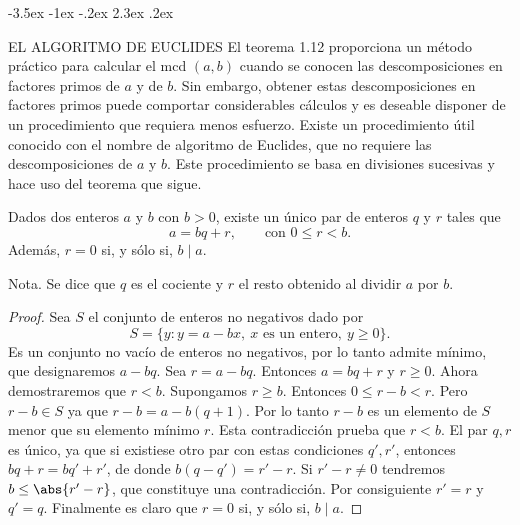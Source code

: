 \documentclass[12pt,a4paper]{book}
\makeatletter
\renewcommand\section{\@startsection{section}{1}{\z@}%
  {-3.5ex \@plus -1ex \@minus -.2ex}%
  {2.3ex \@plus .2ex}%
  {\normalfont\Large\bfseries\raggedright}}
\makeatother
\begin{document}
    \section{EL ALGORITMO DE EUCLIDES}
    El teorema 1.12 proporciona un método práctico para calcular el mcd $(a,b)$ cuando se
    conocen las descomposiciones en factores primos de $a$ y de $b$. Sin embargo, obtener
    estas descomposiciones en factores primos puede comportar considerables cálculos y es
    deseable disponer de un procedimiento que requiera menos esfuerzo. Existe un
    procedimiento útil conocido con el nombre de algoritmo de Euclides, que no requiere las
    descomposiciones de $a$ y $b$. Este procedimiento se basa en divisiones sucesivas y hace
    uso del teorema que sigue.

    \begin{teorema}
        Dados dos enteros $a$ y $b$ con $b>0$, existe un único par de enteros $q$ y $r$ tales
        que
        \begin{equation*}
            a=bq+r,\qquad\text{con } 0\leq r<b.
        \end{equation*}
        Además, $r=0$ si, y sólo si, $b\mid a$.
    \end{teorema}

    Nota. Se dice que $q$ es el cociente y $r$ el resto obtenido al dividir $a$ por $b$.

    \begin{proof}
        Sea $S$ el conjunto de enteros no negativos dado por
        \begin{equation*}
            S=\{y:y=a-bx,\ x\text{ es un entero},\ y\geq0\}.
        \end{equation*}
        Es un conjunto no vacío de enteros no negativos, por lo tanto admite mínimo, que
        designaremos $a-bq$. Sea $r=a-bq$. Entonces $a=bq+r$ y $r\geq0$. Ahora demostraremos
        que $r<b$. Supongamos $r\geq b$. Entonces $0\leq r-b<r$. Pero $r-b\in S$ ya que
        $r-b=a-b(q+1)$. Por lo tanto $r-b$ es un elemento de $S$ menor que su elemento
        mínimo $r$. Esta contradicción prueba que $r<b$. El par $q,r$ es único, ya que si
        existiese otro par con estas condiciones $q',r'$, entonces $bq+r=bq'+r'$, de donde
        $b(q-q')=r'-r$. Si $r'-r\neq0$ tendremos $b\leq\abs{r'-r}$, que constituye una
        contradicción. Por consiguiente $r'=r$ y $q'=q$. Finalmente es claro que $r=0$ si, y
        sólo si, $b\mid a$.
    \end{proof}
\end{document}
